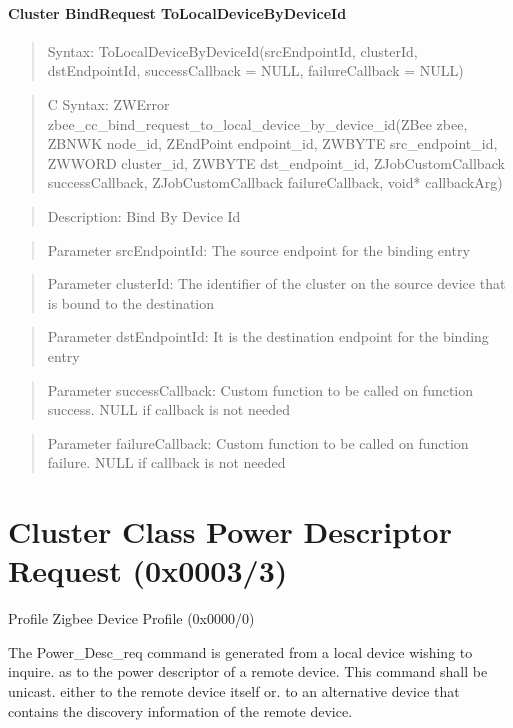 \paragraph{Cluster BindRequest ToLocalDeviceByDeviceId}
\begin{quote}Syntax: ToLocalDeviceByDeviceId(srcEndpointId, clusterId, dstEndpointId, successCallback = NULL, failureCallback = NULL)\end{quote}
\begin{quote}C Syntax: ZWError zbee\_cc\_bind\_request\_to\_local\_device\_by\_device\_id(ZBee zbee, ZBNWK node\_id, ZEndPoint endpoint\_id, ZWBYTE src\_endpoint\_id, ZWWORD cluster\_id, ZWBYTE dst\_endpoint\_id, ZJobCustomCallback successCallback, ZJobCustomCallback failureCallback, void* callbackArg)\end{quote}
\begin{quote}Description: Bind By Device Id\end{quote}
\begin{quote}Parameter srcEndpointId: The source endpoint for the binding entry\end{quote}
\begin{quote}Parameter clusterId: The identifier of the cluster on the source device that is bound to the destination\end{quote}
\begin{quote}Parameter dstEndpointId: It is the destination endpoint for the binding entry\end{quote}
\begin{quote}Parameter successCallback: Custom function to be called on function success. NULL if callback is not needed\end{quote}
\begin{quote}Parameter failureCallback: Custom function to be called on function failure. NULL if callback is not needed\end{quote}



\section{Cluster Class Power Descriptor Request (0x0003/3)}

Profile Zigbee Device Profile (0x0000/0)

The Power\_Desc\_req command is generated from a local device wishing to inquire. as to the power descriptor of a remote device. This command shall be unicast. either to the remote device itself or. to an alternative device that contains the discovery information of the remote device.

